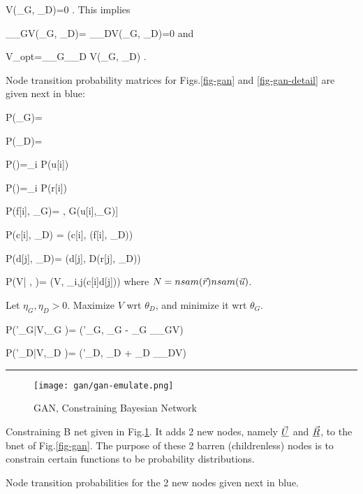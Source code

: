 \beq
\delta V(\theta_G, \theta_D)=0
\;.
\eeq
This implies

\beq
 \partial_{\theta_G}V(\theta_G, \theta_D)=
 \partial_{\theta_D}V(\theta_G, \theta_D)=0
\;
\eeq
and

\beq
V_{opt}=\min_{\theta_G}\max_{\theta_D} V(\theta_G, \theta_D)
\;.
\eeq

Node transition  probability matrices
for Figs.\ref{fig-gan} and \ref{fig-gan-detail} 
are
given next in blue:

\beq\color{blue}
P(\theta_G)=
\eeq

\beq\color{blue}
P(\theta_D)=
\eeq


\beq\color{blue}
P(\vecu)=\prod_i P(u[i])  \;
\eeq

\beq\color{blue}
P(\vecr)=\prod_i P(r[i])
\eeq


\beq\color{blue}
P(f[i]\cond \vecu, \theta_G)= \delta[f[i], G(u[i],\theta_G)]
\eeq

\beq\color{blue}
P(c[i]\cond \vecf, \theta_D) = \delta(c[i], (f[i], \theta_D))
\eeq

\beq\color{blue}
P(d[j]\cond \vecr, \theta_D)= \delta(d[j], D(r[j], \theta_D))
\eeq




\beq\color{blue}
P(V| \vecd,  \vecc)=
\delta(V, \log \prod_{i,j}(c[i]d[j]))
\eeq
where $N=nsam({\vec{r}})nsam({\vec{u}})$.


Let $\eta_G, \eta_D> 0$. Maximize $V$ wrt $\theta_D$, and
minimize it wrt $\theta_G$.

\beq\color{blue}
P(\theta'_G|V,\theta_G )=
\delta(\theta'_G, \theta_G - \eta_G 
\partial_{\theta_G}V)
\eeq

\beq\color{blue}
P(\theta'_D|V,\theta_D )=
\delta(\theta'_D, \theta_D + \eta_D 
\partial_{\theta_D}V)
\eeq

\hrule
\begin{figure}[h!]
\centering
\texttt{[image: gan/gan-emulate.png]}
\caption{GAN, Constraining Bayesian Network}
\label{fig-gan-emulate} 
\end{figure}

Constraining B net given in Fig.\ref{fig-gan-emulate}. It adds 2 new nodes, namely $\underline{\vec{U}}$ and $\underline{\vec{R}}$, to  the bnet of Fig.\ref{fig-gan}. The purpose of these 2  barren (childrenless) nodes is to constrain certain functions to be probability distributions.

Node transition probabilities for the 2 new nodes given next in blue. 


